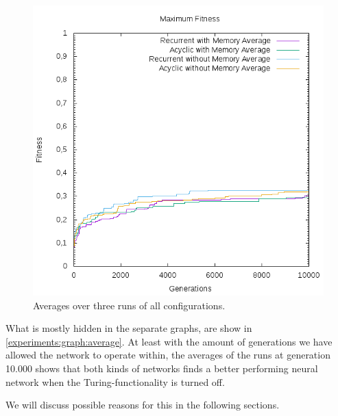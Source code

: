 \begin{figure}[ht]
	\includegraphics[width=\textwidth]{figures/averages.png}
	\caption{Averages over three runs of all configurations.}
	\label{experiments:graph:average}
\end{figure}

\newpar What is mostly hidden in the separate graphs, are show in \autoref{experiments:graph:average}. At least with the amount of generations we have allowed the network to operate within, the averages of the runs at generation 10.000 shows that both kinds of networks finds a better performing neural network when the Turing-functionality is turned off.

\newpar We will discuss possible reasons for this in the following sections.

\clearpage